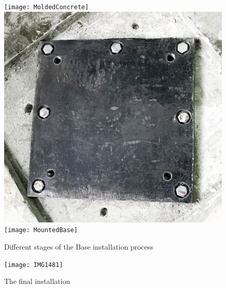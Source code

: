 \begin{figure}[H]
	\begin{center}
		\texttt{[image: MoldedConcrete]}	
		\includegraphics[scale=0.065]{FirstFlange}
		\texttt{[image: MountedBase]}
		\caption{Different stages of the Base installation process}
	\end{center}
\end{figure}

\begin{figure}[H]
	\begin{center}
		\texttt{[image: IMG1481]}	
		\caption{The final installation}
	\end{center}
\end{figure}

%
%    